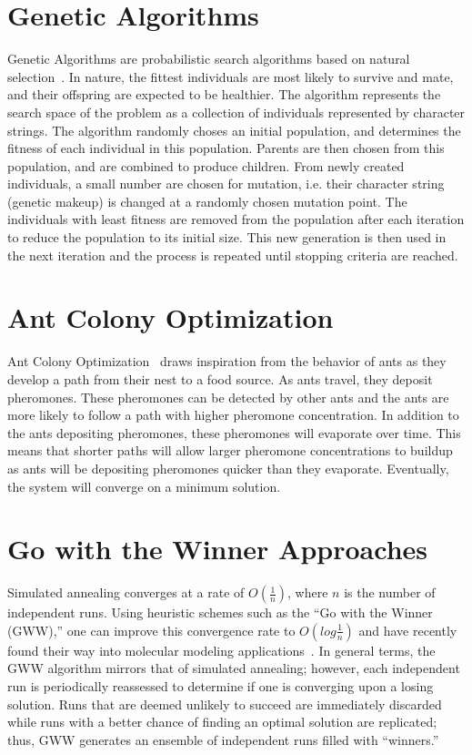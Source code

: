 \documentclass[10pt,twocolumn,notitlepage]{article}
\begin{document}
\section{Genetic Algorithms}
Genetic Algorithms are probabilistic search algorithms based on natural selection~\cite{whitley_genetic_1994}.  In nature, the fittest individuals are most likely to survive and mate, and their offspring are expected to be healthier.  The algorithm represents the search space of the problem as a collection of individuals represented by character strings.  The algorithm randomly choses an initial population, and determines the fitness of each individual in this population.  Parents are then chosen from this population, and are combined to produce children.  From newly created individuals, a small number are chosen for mutation, i.e. their character string (genetic makeup) is changed at a randomly chosen mutation point.  The individuals with least fitness are removed from the population after each iteration to reduce the population to its initial size.  This new generation is then used in the next iteration and the process is repeated until stopping criteria are reached.

\section{Ant Colony Optimization}
Ant Colony Optimization~\cite{Dorigo96theant} draws inspiration from the behavior of ants as they develop a path from their nest to a food source.  As ants travel, they deposit pheromones.  These pheromones can be detected by other ants and the ants are more likely to follow a path with higher pheromone concentration.  In addition to the ants depositing pheromones, these pheromones will evaporate over time.  This means that shorter paths will allow larger pheromone concentrations to buildup as ants will be depositing pheromones quicker than they evaporate.  Eventually, the system will converge on a minimum solution.

\section{Go with the Winner Approaches}
Simulated annealing converges at a rate of $O(\frac{1}{n})$, where $n$ is the number of independent runs.  Using heuristic schemes such as the ``Go with the Winner (GWW),'' one can improve this convergence rate to $O(log \frac{1}{n})$ and have recently found their way into molecular modeling applications~\cite{Peinado1997gwt}.  In general terms, the GWW algorithm mirrors that of simulated annealing; however, each independent run is periodically reassessed to determine if one is converging upon a losing solution.  Runs that are deemed unlikely to succeed are immediately discarded while runs with a better chance of finding an optimal solution are replicated; thus, GWW generates an ensemble of independent runs filled with  ``winners.''
\end{document}
